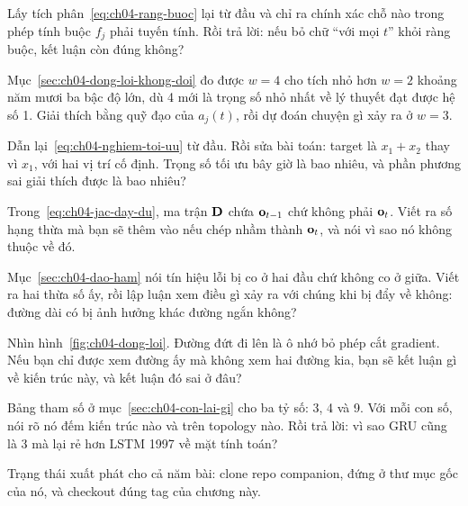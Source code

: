 \exercises

\tierunderstand

\begin{bt}
  \item Lấy tích phân~\eqref{eq:ch04-rang-buoc} lại từ đầu và chỉ ra chính xác
    chỗ nào trong phép tính buộc \(f_j\) phải tuyến tính. Rồi trả lời: nếu bỏ
    chữ \enquote{với mọi \(t\)} khỏi ràng buộc, kết luận còn đúng không?

  \item Mục~\ref{sec:ch04-dong-loi-khong-doi} đo được \(w = 4\) cho tích nhỏ
    hơn \(w = 2\) khoảng năm mươi ba bậc độ lớn, dù 4 mới là trọng số nhỏ nhất
    về lý thuyết đạt được hệ số 1. Giải thích bằng quỹ đạo của \(a_j(t)\), rồi
    dự đoán chuyện gì xảy ra ở \(w = 3\).

  \item Dẫn lại~\eqref{eq:ch04-nghiem-toi-uu} từ đầu. Rồi sửa bài toán: target
    là \(x_1 + x_2\) thay vì \(x_1\), với hai vị trí cố định. Trọng số tối ưu
    bây giờ là bao nhiêu, và phần phương sai giải thích được là bao nhiêu?

  \item Trong~\eqref{eq:ch04-jac-day-du}, ma trận \(\mathbf{D}\) chứa
    \(\mathbf{o}_{t-1}\) chứ không phải \(\mathbf{o}_t\). Viết ra số hạng thừa mà
    bạn sẽ thêm vào nếu chép nhầm thành \(\mathbf{o}_t\), và nói vì sao nó không
    thuộc về đó.

  \item Mục~\ref{sec:ch04-dao-ham} nói tín hiệu lỗi bị co ở hai đầu chứ không
    co ở giữa. Viết ra hai thừa số ấy, rồi lập luận xem điều gì xảy ra với
    chúng khi  bị đẩy về không: đường dài có bị ảnh
    hưởng khác đường ngắn không?

  \item Nhìn hình~\ref{fig:ch04-dong-loi}. Đường đứt đi lên là ô nhớ bỏ phép
    cắt gradient. Nếu bạn chỉ được xem đường ấy mà không xem hai đường kia, bạn
    sẽ kết luận gì về kiến trúc này, và kết luận đó sai ở đâu?

  \item Bảng tham số ở mục~\ref{sec:ch04-con-lai-gi} cho ba tỷ số: 3, 4 và 9.
    Với mỗi con số, nói rõ nó đếm kiến trúc nào và trên topology nào. Rồi trả
    lời: vì sao GRU cũng là 3 mà lại rẻ hơn LSTM 1997 về mặt tính toán?
\end{bt}

\tierapply

Trạng thái xuất phát cho cả năm bài: clone repo companion, đứng ở thư mục gốc
của nó, và checkout đúng tag của chương này.

